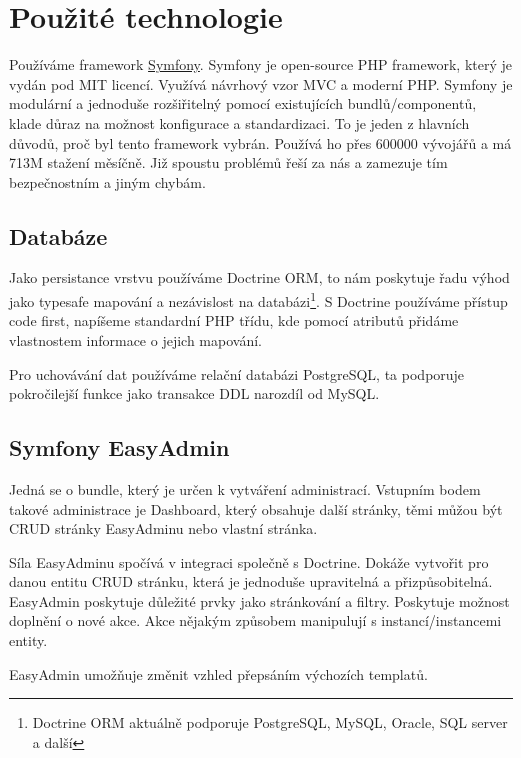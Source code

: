 
\section{Použité technologie}

Používáme framework \href{https://symfony.com/}{Symfony}.
Symfony je open-source PHP framework, který je vydán pod MIT licencí.
Využívá návrhový vzor MVC a moderní PHP.
Symfony je modulární a jednoduše rozšiřitelný pomocí existujících bundlů/componentů, klade důraz na možnost konfigurace a standardizaci.
To je jeden z hlavních důvodů, proč byl tento framework vybrán.
Používá ho přes 600000 vývojářů a má 713M stažení měsíčně.\cite{symfony:what-is}
Již spoustu problémů řeší za nás a zamezuje tím bezpečnostním a jiným chybám.


\subsection{Databáze}
Jako persistance vrstvu používáme Doctrine ORM, to nám poskytuje řadu výhod jako typesafe mapování a nezávislost na databázi\footnote{Doctrine ORM aktuálně podporuje PostgreSQL, MySQL, Oracle, SQL server a další\cite{doctrine-supported-dbs}}.
S Doctrine používáme přístup code first, napíšeme standardní PHP třídu, kde pomocí atributů přidáme vlastnostem informace o jejich mapování. 

Pro uchovávání dat používáme relační databázi PostgreSQL, ta podporuje pokročilejší funkce jako transakce DDL narozdíl od MySQL.  


\subsection{Symfony EasyAdmin}

Jedná se o bundle, který je určen k vytváření administrací.
Vstupním bodem takové administrace je Dashboard, který obsahuje další stránky, těmi můžou být CRUD stránky EasyAdminu nebo vlastní stránka.

Síla EasyAdminu spočívá v integraci společně s Doctrine.
Dokáže vytvořit pro danou entitu CRUD stránku, která je jednoduše upravitelná a přizpůsobitelná.
EasyAdmin poskytuje důležité prvky jako stránkování a filtry.
Poskytuje možnost doplnění o nové akce. Akce nějakým způsobem manipulují s instancí/instancemi entity.

EasyAdmin umožňuje změnit vzhled přepsáním výchozích templatů.


